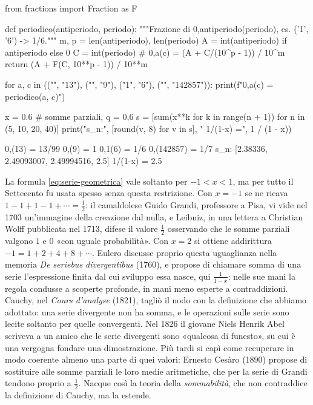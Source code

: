 \begin{python}
from fractions import Fraction as F

def periodico(antiperiodo, periodo):
    """Frazione di 0,antiperiodo(periodo), es. ('1', '6') -> 1/6."""
    m, p = len(antiperiodo), len(periodo)
    A = int(antiperiodo) if antiperiodo else 0
    C = int(periodo)
    # 0,a(c) = (A + C/(10^p - 1)) / 10^m
    return (A + F(C, 10**p - 1)) / 10**m

for a, c in (("", "13"), ("", "9"), ("1", "6"), ("", "142857")):
    print(f"0,{a}({c}) = {periodico(a, c)}")

x = 0.6                                    # somme parziali, q = 0,6
s = [sum(x**k for k in range(n + 1)) for n in (5, 10, 20, 40)]
print("s_n:", [round(v, 8) for v in s], " 1/(1-x) =", 1 / (1 - x))
\end{python}
\begin{risultato}
0,(13) = 13/99
0,(9) = 1
0,1(6) = 1/6
0,(142857) = 1/7
s_n: [2.38336, 2.49093007, 2.49994516, 2.5]  1/(1-x) = 2.5
\end{risultato}

\begin{notastorica}
La formula \eqref{eq:serie-geometrica} vale soltanto per $-1<x<1$, ma per tutto il
Settecento fu usata spesso senza questa restrizione. Con $x=-1$ se ne ricava
$1-1+1-1+\cdots=\frac12$: il camaldolese Guido Grandi, professore a Pisa, vi vide nel 1703
un'immagine della creazione dal nulla, e Leibniz, in una lettera a Christian Wolff
pubblicata nel 1713, difese il valore $\frac12$ osservando che le somme parziali valgono $1$
e $0$ «con uguale probabilità». Con $x=2$ si ottiene addirittura $-1=1+2+4+8+\cdots$.
Eulero discusse proprio questa uguaglianza nella memoria \emph{De seriebus divergentibus}
(1760), e propose di chiamare somma di una serie l'espressione finita dal cui sviluppo
essa nasce, qui $\frac1{1-x}$: nelle sue mani la regola condusse a scoperte profonde, in mani
meno esperte a contraddizioni. Cauchy, nel \emph{Cours d'analyse} (1821), tagliò il nodo
con la definizione che abbiamo adottato: una serie divergente non ha somma, e le
operazioni sulle serie sono lecite soltanto per quelle convergenti. Nel 1826 il giovane
Niels Henrik Abel scriveva a un amico che le serie divergenti sono «qualcosa di funesto»,
su cui è una vergogna fondare una dimostrazione. Più tardi si capì come recuperare in
modo coerente almeno una parte di quei valori: Ernesto Cesàro (1890) propose di
sostituire alle somme parziali le loro medie aritmetiche, che per la serie di Grandi
tendono proprio a $\frac12$. Nacque così la teoria della \emph{sommabilità}, che non
contraddice la definizione di Cauchy, ma la estende.
\end{notastorica}
